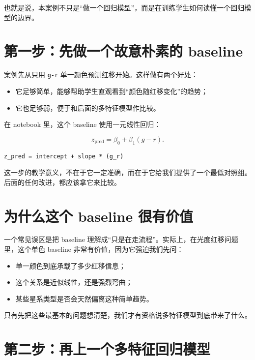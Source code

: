 也就是说，本案例不只是“做一个回归模型”，而是在训练学生如何读懂一个回归模型的边界。

\section{第一步：先做一个故意朴素的 baseline}

案例先从只用 \texttt{g-r} 单一颜色预测红移开始。这样做有两个好处：

\begin{itemize}
    \item 它足够简单，能够帮助学生直观看到“颜色随红移变化”的趋势；
    \item 它也足够弱，便于和后面的多特征模型作比较。
\end{itemize}

在 notebook 里，这个 baseline 使用一元线性回归：

\[
z_{\mathrm{pred}} = \beta_0 + \beta_1 (g-r).
\]

\begin{examplebox}[一元 baseline]
\begin{lstlisting}[style=pythonstyle]
z_pred = intercept + slope * (g_r)
\end{lstlisting}
\end{examplebox}

这一步的教学意义，不在于它一定准确，而在于它给我们提供了一个最低对照组。后面的任何改进，都应该拿它来比较。

\section{为什么这个 baseline 很有价值}

一个常见误区是把 baseline 理解成“只是在走流程”。实际上，在光度红移问题里，这个单色 baseline 非常有价值，因为它强迫我们先问：

\begin{itemize}
    \item 单一颜色到底承载了多少红移信息；
    \item 这个关系是近似线性，还是强烈弯曲；
    \item 某些星系类型是否会天然偏离这种简单趋势。
\end{itemize}

只有先把这些最基本的问题想清楚，我们才有资格说多特征模型到底带来了什么。

\section{第二步：再上一个多特征回归模型}

